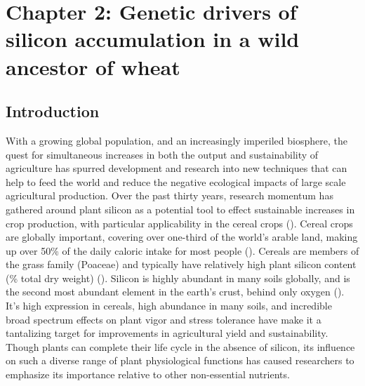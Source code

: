 \documentclass[12pt, letterpaper, ]{report}
\begin{document}
\clearpage



\chapter{Chapter 2: Genetic drivers of silicon accumulation in a wild ancestor of wheat}

\section{Introduction}

With a growing global population, and an increasingly imperiled biosphere, the quest for simultaneous increases in both the output and sustainability of agriculture has spurred development and research into new techniques that can help to feed the world and reduce the negative ecological impacts of large scale agricultural production. Over the past thirty years, research momentum has gathered around plant silicon as a potential tool to effect sustainable increases in crop production, with particular applicability in the cereal crops (\cite{reynolds_silicon_2016,christian_breeding_2022}). Cereal crops are globally important, covering over one-third of the world’s arable land, making up over 50\% of the daily caloric intake for most people (\cite{faostat, rudel_agricultural_2009, awika_major_2011}). Cereals are members of the grass family (Poaceae) and typically have relatively high plant silicon content (\% total dry weight) (\cite{reynolds_silicon_2016}). Silicon is highly abundant in many soils globally, and is the second most abundant element in the earth’s crust, behind only oxygen (\cite{ma_functions_2003}). It’s high expression in cereals, high abundance in many soils, and incredible broad spectrum effects on plant vigor and stress tolerance have make it a tantalizing target for improvements in agricultural yield and sustainability. Though plants can complete their life cycle in the absence of silicon, its influence on such a diverse range of plant physiological functions has caused researchers to emphasize its importance relative to other non-essential nutrients. 
\end{document}
